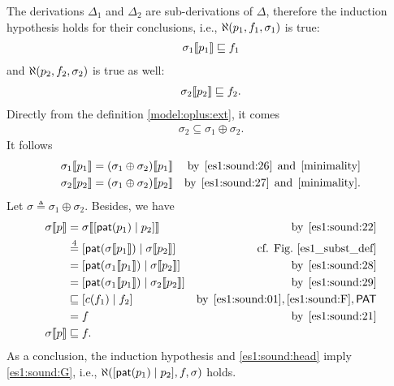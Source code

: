 \begin{enumerate}
\begin{enumerate}
    \end{enumerate}
    The derivations \(\Delta_1\) and \(\Delta_2\) are
    sub\hyp{}derivations of \(\Delta\), therefore the induction
    hypothesis holds for their conclusions, i.e.,
    \(\ind{U}(p_1, f_1, \sigma_1)\) is true:
    \begin{gather}
      \subst{p_1}{\sigma_1} \sqsubseteq f_1 \label{es1:sound:01}
    \end{gather}
    and \(\ind{U}(p_2, f_2, \sigma_2)\) is true as well:
    \begin{gather}
      \subst{p_2}{\sigma_2} \sqsubseteq f_2. \label{es1:sound:F}
    \end{gather}
    Directly from the definition \eqref{model:oplus:ext}, it comes
    \begin{gather}
      \sigma_2 \subseteq \sigma_1 \oplus \sigma_2. \label{es1:sound:27}
    \end{gather}
    It follows
    \begin{align}
       \subst{p_1}{\sigma_1}
      &= \subst{p_1}{(\sigma_1 \oplus \sigma_2)}
      &\text{by} \,\; \text{\ref{es1:sound:26}} \,\; \text{and} \,\;
        \text{\ref{minimality}}\label{es1:sound:28}\\
        \subst{p_2}{\sigma_2}
      &= \subst{p_2}{(\sigma_1 \oplus \sigma_2)}
      &\text{by} \,\; \eqref{es1:sound:27} \,\; \text{and} \,\;
        \text{\ref{minimality}}.\label{es1:sound:29}
    \end{align}
    Let \(\sigma \triangleq \sigma_1 \oplus \sigma_2\). Besides, we
    have
    \begin{align}
         \subst{p}{\sigma}
      &= \subst{\cons{\pat{p_1}}{p_2}}{\sigma}
      &\text{by} \,\; \text{\ref{es1:sound:22}}\notag\\
      &\eqn{4}
       \cons{\pat{\subst{p_1}{\sigma}}}%
            {\subst{p_2}{\sigma}}
      &\text{cf. Fig.~\ref{es1_subst_def}}\notag\\
      &= \cons{\pat{\subst{p_1}{\sigma_1}}}%
              {\subst{p_2}{\sigma}}
      &\text{by} \,\; \eqref{es1:sound:28}\notag\\
      &= \cons{\pat{\subst{p_1}{\sigma_1}}}%
              {\subst{p_2}{\sigma_2}}
      &\text{by} \,\; \eqref{es1:sound:29}\notag\\
      &\sqsubseteq \cons{c(f_1)}{f_2}
      &\text{by} \,\; \eqref{es1:sound:01}, \eqref{es1:sound:F},
       \textsf{PAT}\notag\\
      &= f
      &\text{by} \,\; \text{\ref{es1:sound:21}}\notag\\
       \subst{p}{\sigma}
      &\sqsubseteq f. \label{es1:sound:G}
    \end{align}
    As a conclusion, the induction hypothesis and
    \eqref{es1:sound:head} imply \eqref{es1:sound:G},
    i.e., \(\ind{U}(\cons{\pat{p_1}}{p_2}, f,
    \sigma)\) holds.


\end{enumerate}
